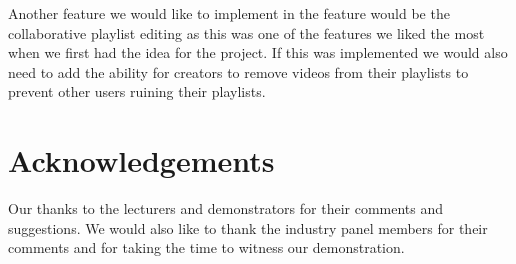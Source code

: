 \documentclass{sig-alt-release2}
\begin{document}
Another feature we would like to implement in the feature would be the collaborative playlist editing as this was one of the features we liked the most when we first had the idea for the project. If this was implemented we would also need to add the ability for creators to remove videos from their playlists to prevent other users ruining their playlists.

\section{Acknowledgements}
Our thanks to the lecturers and demonstrators for their comments and
suggestions.
We would also like to thank the industry panel members for their
comments and for taking the time to witness our demonstration.



\end{document}
